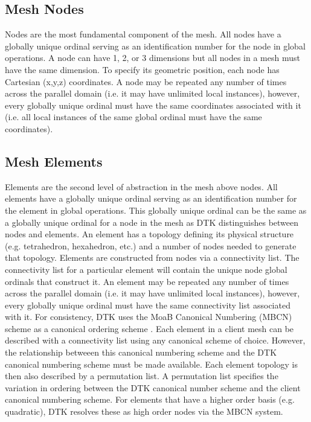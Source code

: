 \documentclass[letterpaper]{article}
\begin{document}
\subsection{Mesh Nodes}
Nodes are the most fundamental component of the mesh. All nodes have a
globally unique ordinal serving as an identification number for the
node in global operations. A node can have 1, 2, or 3 dimensions but
all nodes in a mesh must have the same dimension. To specify its
geometric position, each node has Cartesian (x,y,z) coordinates. A
node may be repeated any number of times across the parallel domain
(i.e. it may have unlimited local instances), however, every globally
unique ordinal must have the same coordinates associated with it
(i.e. all local instances of the same global ordinal must have the
same coordinates).

\subsection{Mesh Elements}
Elements are the second level of abstraction in the mesh above
nodes. All elements have a globally unique ordinal serving as an
identification number for the element in global operations. This
globally unique ordinal can be the same as a globally unique ordinal
for a node in the mesh as DTK distinguishes between nodes and
elements. An element has a topology defining its physical structure
(e.g. tetrahedron, hexahedron, etc.) and a number of nodes needed to
generate that topology. Elements are constructed from nodes via a
connectivity list. The connectivity list for a particular element will
contain the unique node global ordinals that construct it. An element
may be repeated any number of times across the parallel domain
(i.e. it may have unlimited local instances), however, every globally
unique ordinal must have the same connectivity list associated with
it. For consistency, DTK uses the MoaB Canonical Numbering (MBCN)
scheme as a canonical ordering scheme \cite{Tautges_2009}. Each
element in a client mesh can be described with a connectivity list
using any canonical scheme of choice. However, the relationship
betweeen this canonical numbering scheme and the DTK canonical
numbering scheme must be made available. Each element topology is then
also described by a permutation list. A permutation list specifies the
variation in ordering between the DTK canonical number scheme and the
client canonical numbering scheme. For elements that have a higher
order basis (e.g. quadratic), DTK resolves these as high order nodes
via the MBCN system.
\end{document}
